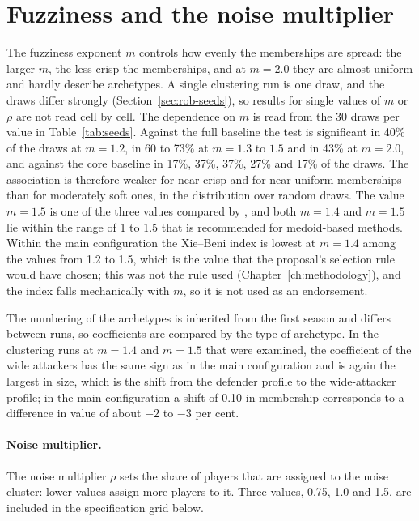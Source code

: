 \section{Fuzziness and the noise multiplier}
\label{sec:rob-fuzziness}

The fuzziness exponent $m$ controls how evenly the memberships are spread: the larger $m$, the less crisp the memberships, and at $m=2.0$ they are almost uniform and hardly describe archetypes. A single clustering run is one draw, and the draws differ strongly (Section~\ref{sec:rob-seeds}), so results for single values of $m$ or $\rho$ are not read cell by cell. The dependence on $m$ is read from the 30 draws per value in Table~\ref{tab:seeds}. Against the full baseline the test is significant in 40\% of the draws at $m=1.2$, in 60 to 73\% at $m=1.3$ to $1.5$ and in 43\% at $m=2.0$, and against the core baseline in 17\%, 37\%, 37\%, 27\% and 17\% of the draws. The association is therefore weaker for near-crisp and for near-uniform memberships than for moderately soft ones, in the distribution over random draws. The value $m=1.5$ is one of the three values compared by , and both $m=1.4$ and $m=1.5$ lie within the range of 1 to 1.5 that is recommended for medoid-based methods. Within the main configuration the Xie--Beni index is lowest at $m=1.4$ among the values from 1.2 to 1.5, which is the value that the proposal's selection rule would have chosen; this was not the rule used (Chapter~\ref{ch:methodology}), and the index falls mechanically with $m$, so it is not used as an endorsement.

The numbering of the archetypes is inherited from the first season and differs between runs, so coefficients are compared by the type of archetype. In the clustering runs at $m=1.4$ and $m=1.5$ that were examined, the coefficient of the wide attackers has the same sign as in the main configuration and is again the largest in size, which is the shift from the defender profile to the wide-attacker profile; in the main configuration a shift of 0.10 in membership corresponds to a difference in value of about $-2$ to $-3$ per cent.

\paragraph{Noise multiplier.} The noise multiplier $\rho$ sets the share of players that are assigned to the noise cluster: lower values assign more players to it. Three values, 0.75, 1.0 and 1.5, are included in the specification grid below.

